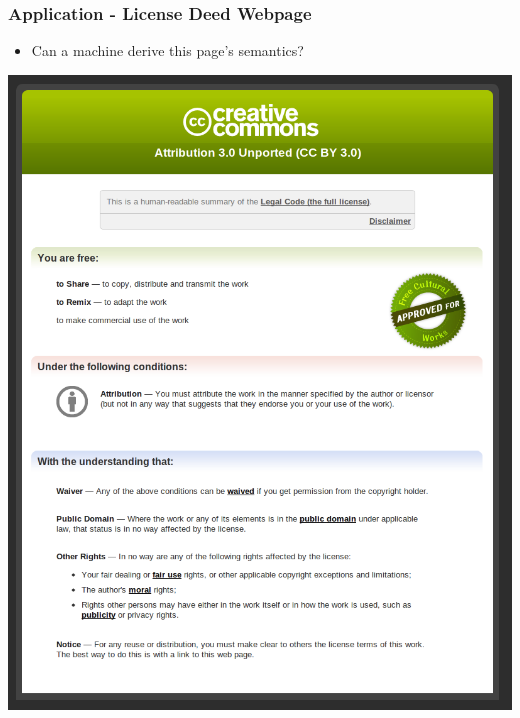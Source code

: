 \documentclass[t, xcolor=dvipsnames, handout, 10pt]{beamer}
\begin{document}
\begin{frame}[t]
\frametitle{Application - License Deed Webpage}
        \begin{itemize}
            \item Can a machine derive this page's semantics?
        \end{itemize}
        \begin{center}
            \includegraphics[height=0.8\textheight]{resources/cc/cc-deed-rendered-in-browser.png}
        \end{center}
\end{frame}
\end{document}
